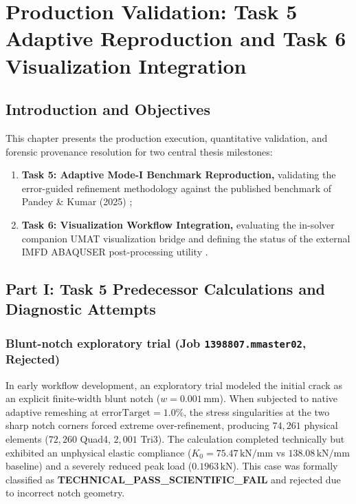 \chapter{Production Validation: Task 5 Adaptive Reproduction and Task 6 Visualization Integration}
\label{chap:production_validation}

\section{Introduction and Objectives}
This chapter presents the production execution, quantitative validation, and forensic provenance resolution for two central thesis milestones:
\begin{enumerate}
  \item \textbf{Task 5: Adaptive Mode-I Benchmark Reproduction,} validating the error-guided refinement methodology against the published benchmark of Pandey \& Kumar (2025) \citep{Pandey2025};
  \item \textbf{Task 6: Visualization Workflow Integration,} evaluating the in-solver companion UMAT visualization bridge and defining the status of the external IMFD \textsc{ABAQUSER} post-processing utility \citep{Roth2014}.
\end{enumerate}

\section{Part I: Task 5 Predecessor Calculations and Diagnostic Attempts}

\subsection{Blunt-notch exploratory trial (Job \texttt{1398807.mmaster02}, Rejected)}
In early workflow development, an exploratory trial modeled the initial crack as an explicit finite-width blunt notch ($w = 0.001\,\mathrm{mm}$). When subjected to native adaptive remeshing at $\text{errorTarget} = 1.0\%$, the stress singularities at the two sharp notch corners forced extreme over-refinement, producing $74{,}261$ physical elements ($72{,}260$ Quad4, $2{,}001$ Tri3). The calculation completed technically but exhibited an unphysical elastic compliance ($K_0 = 75.47\,\mathrm{kN/mm}$ vs $138.08\,\mathrm{kN/mm}$ baseline) and a severely reduced peak load ($0.1963\,\mathrm{kN}$). This case was formally classified as \textbf{TECHNICAL\_PASS\_SCIENTIFIC\_FAIL} and rejected due to incorrect notch geometry.

